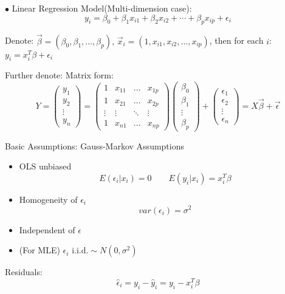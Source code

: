 \documentclass[11pt,a4paper]{ctexart}
\numberwithin{equation}{section}%
\begin{document}
    $\bullet$ Linear Regression Model(Multi-dimension case):
\[
    y_i=\beta_0+\beta_1x_{i1}+\beta_2x_{i2}+\cdots+\beta_px_{ip}+\epsilon_i    
\]

    Denote: $\vec{\beta}=(\beta_0,\beta_1,\ldots,\beta_p),\, \vec{x}_i=(1,x_{i1},x_{i2},\ldots,x_{ip})$, then for each $i$: $y_i=x_i^T\beta+\epsilon_i$

    Further denote: Matrix form:
    \[
        Y=\begin{pmatrix}
            y_1\\
            y_2\\
            \vdots\\
            y_n
        \end{pmatrix}  
        =
        \begin{pmatrix}
            1&x_{11}&\ldots&x_{1p}\\
            1&x_{21}&\ldots&x_{2p}\\
            \vdots&\vdots&\ddots&\vdots\\
            1&x_{n1}&\ldots&x_{np}
        \end{pmatrix}
        \begin{pmatrix}
            \beta_0\\
            \beta_1\\
            \vdots\\
            \beta_p
        \end{pmatrix}
        +
        \begin{pmatrix}
            \epsilon_1\\
            \epsilon_2\\
            \vdots\\
            \epsilon_n
        \end{pmatrix}
        =X\vec{\beta}+\vec{\epsilon}
    \]

    Basic Assumptions: Gauss-Markov Assumptions
    \begin{itemize}
        \item OLS unbiased\[E(\epsilon_i|x_i)=0\qquad E(y_i|x_i)=x_i^T\beta\]
        \item Homogeneity of $\epsilon_i$\[var(\epsilon_i)=\sigma^2\]
        \item Independent of $\epsilon$
        \item (For MLE) $\epsilon_i\text{ i.i.d.}\sim N(0,\sigma^2)$
    \end{itemize}

    Residuals:
    \[\hat{\epsilon}_i=y_i-\hat{y}_i=y_i-x_i^T\beta\]
\end{document}
